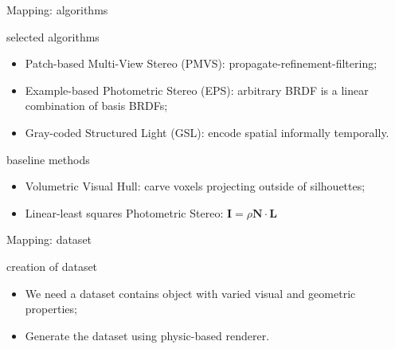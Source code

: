 \documentclass[10pt]{beamer}
\begin{document}
\begin{frame}{Mapping: algorithms}

\begin{exampleblock}{selected algorithms}
\begin{itemize}
\item Patch-based Multi-View Stereo (PMVS): propagate-refinement-filtering;
\item Example-based Photometric Stereo (EPS): arbitrary BRDF is a linear combination of basis BRDFs;
\item Gray-coded Structured Light (GSL): encode spatial informally temporally.
\end{itemize}
\end{exampleblock}

\begin{exampleblock}{baseline methods}
\begin{itemize}
\item Volumetric Visual Hull: carve voxels projecting outside of silhouettes;
\item Linear-least squares Photometric Stereo: $\mathbf{I}=\rho\mathbf{N}\cdot\mathbf{L}$
\end{itemize}
\end{exampleblock}

\end{frame}

\begin{frame}{Mapping: dataset}

\begin{exampleblock}{creation of dataset}
\begin{itemize}
\item We need a dataset contains object with varied visual and geometric properties;
\item Generate the dataset using physic-based renderer.
\end{itemize}
\end{exampleblock}


\end{frame}
\end{document}
